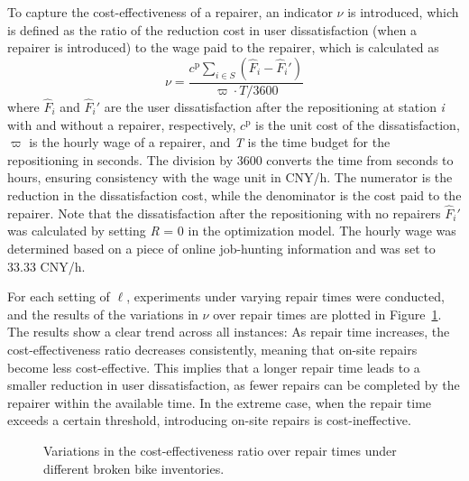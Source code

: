 To capture the cost-effectiveness of a repairer, an indicator \(\nu\) is introduced, which is
defined as the ratio of the reduction cost in user dissatisfaction (when a repairer is introduced)
to the wage paid to the repairer, which is calculated
as\begin{equation}
\label{ch4:eq:73}
\nu = \frac{c^{\text{p}}\sum_{i \in S}\left( {{\widehat{F}}_{i} - {\widehat{F}}_{i}'} \right)}{\left. \varpi \cdot T/3600 \right.}
\end{equation}where
\({\widehat{F}}_{i}\) and \({\widehat{F}}_{i}'\) are the user dissatisfaction after the
repositioning at station \emph{i} with and without a repairer, respectively, \(c^{\text{p}}\) is the
unit cost of the dissatisfaction, \(\varpi\) is the hourly wage of a repairer, and \emph{T} is the
time budget for the repositioning in seconds. The division by 3600 converts the time from seconds to
hours, ensuring consistency with the wage unit in CNY/h. The numerator is the reduction in the
dissatisfaction cost, while the denominator is the cost paid to the repairer. Note that the
dissatisfaction after the repositioning with no repairers \({\widehat{F}}_{i}'\) was calculated by
setting \textbar{}\emph{R}\textbar{} = 0 in the optimization model. The hourly wage was determined
based on a piece of online job-hunting information and was set to 33.33 CNY/h.

For each setting of \(\ell\), experiments under varying repair times were conducted, and the results
of the variations in \(\nu\) over repair times are plotted in Figure~\ref{ch4:fig:repair-cost-effectiveness}. The results show a clear
trend across all instances: As repair time increases, the cost-effectiveness ratio decreases
consistently, meaning that on-site repairs become less cost-effective. This implies that a longer
repair time leads to a smaller reduction in user dissatisfaction, as fewer repairs can be completed
by the repairer within the available time. In the extreme case, when the repair time exceeds a
certain threshold, introducing on-site repairs is cost-ineffective.

\begin{figure}[htbp]
\centering
{}
\caption{Variations in the cost-effectiveness ratio over repair times under different broken bike inventories.}
\label{ch4:fig:repair-cost-effectiveness}
\end{figure}

